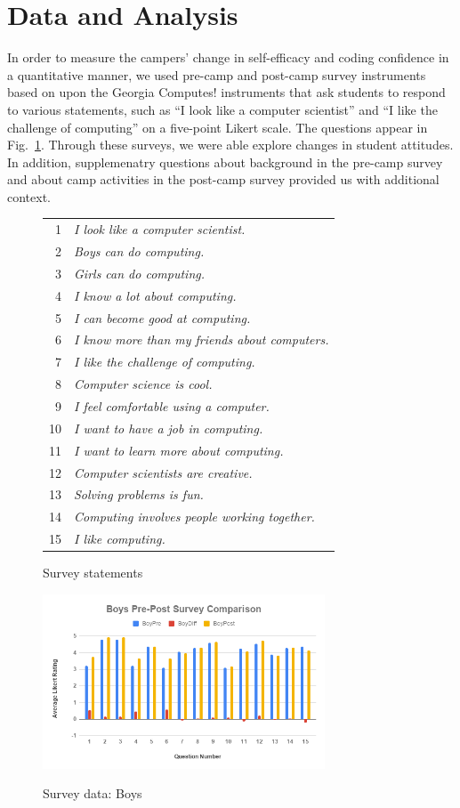 \section{Data and Analysis}

In order to measure the campers' change in self-efficacy and coding
confidence in a quantitative manner, we used pre-camp and post-camp
survey instruments based on upon the Georgia Computes! instruments
\cite{Bruckman2009} that ask students to respond to various statements,
such as ``I look like a computer scientist'' and ``I like the
challenge of computing'' on a five-point Likert scale.  The questions
appear in Fig.~\ref{figure:survey}.  Through these surveys, we were
able explore changes in student attitudes.  In addition, supplemenatry
questions about background in the pre-camp survey and about camp
activities in the post-camp survey provided us with additional
context.

\begin{figure}
{\small
\begin{tabular}{rl}
1 & \textit{I look like a computer scientist.} \\
2 & \textit{Boys can do computing.} \\
3 & \textit{Girls can do computing.} \\
4 & \textit{I know a lot about computing.} \\
5 & \textit{I can become good at computing.} \\
6 & \textit{I know more than my friends about computers.} \\
7 & \textit{I like the challenge of computing.} \\
8 & \textit{Computer science is cool.} \\
9 & \textit{I feel comfortable using a computer.} \\
10 & \textit{I want to have a job in computing.} \\
11 & \textit{I want to learn more about computing.} \\
12 & \textit{Computer scientists are creative.} \\
13 & \textit{Solving problems is fun.} \\
14 & \textit{Computing involves people working together.} \\
15 & \textit{I like computing.} 
\end{tabular}
}
\label{figure:survey}
\caption{Survey statements}
\end{figure}

\begin{figure}
\includegraphics[width=3.3in]{images/boys}
\label{figure:boys}
\caption{Survey data: Boys}
\end{figure}

